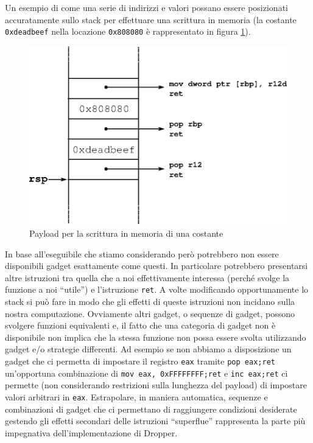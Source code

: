 Un esempio di come una serie di indirizzi e valori possano essere
posizionati accuratamente sullo stack per effettuare una scrittura in
memoria (la costante \lstinline{0xdeadbeef} nella locazione
\lstinline{0x808080} è rappresentato in figura \ref{fig:rop}).

\begin{figure}
\includegraphics{rop}
\caption{Payload per la scrittura in memoria di una costante}
\label{fig:rop}
\end{figure}

In base all'eseguibile che stiamo considerando però potrebbero non
essere disponibili gadget esattamente come questi.  In particolare
potrebbero presentarsi altre istruzioni tra quella che a noi
effettivamente interessa (perché svolge la funzione a noi ``utile'') e
l'istruzione \lstinline{ret}. A volte modificando opportunamente lo
stack si può fare in modo che gli effetti di queste istruzioni non
incidano sulla nostra computazione. Ovviamente altri gadget, o
sequenze di gadget, possono svolgere funzioni equivalenti e, il fatto
che una categoria di gadget non è disponibile non implica che la
stessa funzione non possa essere svolta utilizzando gadget e/o
strategie differenti. Ad esempio se non abbiamo a disposizione un
gadget che ci permetta di impostare il registro \lstinline{eax}
tramite \lstinline{pop eax;ret} un'opportuna combinazione di
\lstinline{mov eax, 0xFFFFFFFF;ret} e \lstinline{inc eax;ret} ci
permette (non considerando restrizioni sulla lunghezza del payload) di
impostare valori arbitrari in \lstinline{eax}. Estrapolare, in maniera
automatica, sequenze e combinazioni di gadget che ci permettano di
raggiungere condizioni desiderate gestendo gli effetti secondari delle
istruzioni ``superflue'' rappresenta la parte più impegnativa
dell'implementazione di Dropper.

